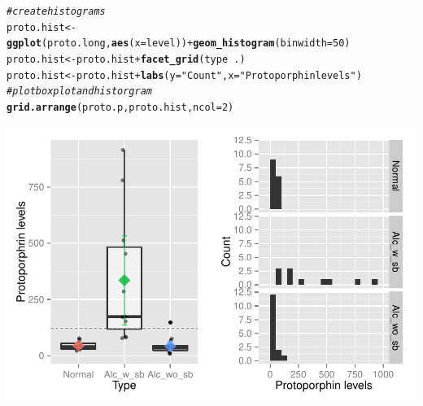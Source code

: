 \documentclass{article}\usepackage[]{graphicx}\usepackage[]{color}
\makeatletter
\def\maxwidth{ %
  \ifdim\Gin@nat@width>\linewidth
    \linewidth
  \else
    \Gin@nat@width
  \fi
}
\newcommand{\hlnum}[1]{\textcolor[rgb]{0.686,0.059,0.569}{#1}}%
\newcommand{\hlstr}[1]{\textcolor[rgb]{0.192,0.494,0.8}{#1}}%
\newcommand{\hlcom}[1]{\textcolor[rgb]{0.678,0.584,0.686}{\textit{#1}}}%
\newcommand{\hlopt}[1]{\textcolor[rgb]{0,0,0}{#1}}%
\newcommand{\hlstd}[1]{\textcolor[rgb]{0.345,0.345,0.345}{#1}}%
\newcommand{\hlkwb}[1]{\textcolor[rgb]{0.69,0.353,0.396}{#1}}%
\newcommand{\hlkwc}[1]{\textcolor[rgb]{0.333,0.667,0.333}{#1}}%
\newcommand{\hlkwd}[1]{\textcolor[rgb]{0.737,0.353,0.396}{\textbf{#1}}}%
\newenvironment{kframe}{%
 \def\at@end@of@kframe{}%
 \ifinner\ifhmode%
  \def\at@end@of@kframe{\end{minipage}}%
  \begin{minipage}{\columnwidth}%
 \fi\fi%
 \def\FrameCommand##1{\hskip\@totalleftmargin \hskip-\fboxsep
 \colorbox{shadecolor}{##1}\hskip-\fboxsep
     \hskip-\linewidth \hskip-\@totalleftmargin \hskip\columnwidth}%
 \MakeFramed {\advance\hsize-\width
   \@totalleftmargin\z@ \linewidth\hsize
   \@setminipage}}%
 {\par\unskip\endMakeFramed%
 \at@end@of@kframe}
\newenvironment{knitrout}{}{} %
\makeatother
\begin{document}
\begin{knitrout}
\begin{kframe}
\begin{alltt}
\hlcom{# create histograms}
\hlstd{proto.hist} \hlkwb{<-} \hlkwd{ggplot}\hlstd{(proto.long,} \hlkwd{aes}\hlstd{(}\hlkwc{x} \hlstd{= level))} \hlopt{+} \hlkwd{geom_histogram}\hlstd{(}\hlkwc{binwidth} \hlstd{=} \hlnum{50}\hlstd{)}
\hlstd{proto.hist} \hlkwb{<-} \hlstd{proto.hist} \hlopt{+} \hlkwd{facet_grid}\hlstd{(type} \hlopt{~} \hlstd{.)}
\hlstd{proto.hist} \hlkwb{<-} \hlstd{proto.hist} \hlopt{+} \hlkwd{labs}\hlstd{(}\hlkwc{y} \hlstd{=} \hlstr{"Count"}\hlstd{,} \hlkwc{x} \hlstd{=} \hlstr{"Protoporphin levels"}\hlstd{)}
\hlcom{# plot boxplot and historgram}
\hlkwd{grid.arrange}\hlstd{(proto.p, proto.hist,} \hlkwc{ncol} \hlstd{=} \hlnum{2}\hlstd{)}
\end{alltt}
\end{kframe}

{\centering \includegraphics[width=\maxwidth]{figure/4_a_plot-1} 

}



\end{knitrout}
\end{document}
